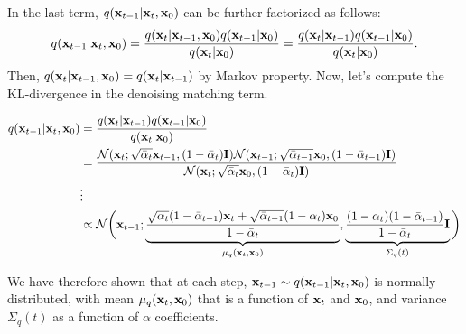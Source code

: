 In the last term, $q({\mathbf{x}}_{t-1}|{\mathbf{x}}_t, {\mathbf{x}}_0)$ can be further factorized as follows:
\begin{align*}
	q({\mathbf{x}}_{t-1}|{\mathbf{x}}_t, {\mathbf{x}}_0) = \frac{q({\mathbf{x}}_{t}|{\mathbf{x}}_{t-1}, {\mathbf{x}}_0)q({\mathbf{x}}_{t-1}|{\mathbf{x}}_0)}{q({\mathbf{x}}_{t}|{\mathbf{x}}_0)}=\frac{q({\mathbf{x}}_{t}|{\mathbf{x}}_{t-1})q({\mathbf{x}}_{t-1}|{\mathbf{x}}_0)}{q({\mathbf{x}}_{t}|{\mathbf{x}}_0)}.
\end{align*}
Then, $q({\mathbf{x}}_{t}|{\mathbf{x}}_{t-1}, {\mathbf{x}}_0) = q({\mathbf{x}}_{t}|{\mathbf{x}}_{t-1})$ by Markov property. Now, let's compute the KL-divergence in the denoising matching term. 

\begin{align}
	q({\mathbf{x}}_{t-1}|{\mathbf{x}}_t, {\mathbf{x}}_0) &=\frac{q({\mathbf{x}}_{t}|{\mathbf{x}}_{t-1})q({\mathbf{x}}_{t-1}|{\mathbf{x}}_0)}{q({\mathbf{x}}_{t}|{\mathbf{x}}_0)}\\
								 &= \frac{\mathcal{N}(\mathbf{x}_t; \sqrt{\bar{\alpha}_t} {\mathbf{x}}_{t-1}, (1-\bar{\alpha}_t)\mathbf{I})\mathcal{N}(\mathbf{x}_{t-1}; \sqrt{\bar{\alpha}_{t-1}} {\mathbf{x}}_{0}, (1-\bar{\alpha}_{t-1})\mathbf{I})}{\mathcal{N}(\mathbf{x}_t; \sqrt{\bar{\alpha}_t} {\mathbf{x}}_{0}, (1-\bar{\alpha}_t)\mathbf{I})}\\
								 & \vdots\\
								 &\propto \mathcal{N}\bigg({\mathbf{x}}_{t-1};\underbrace{\frac{\sqrt{{\alpha}_{t}}(1-\bar{\alpha}_{t-1}){\mathbf{x}}_t+\sqrt{\bar{\alpha}_{t-1}}(1-{\alpha}_{t}){\mathbf{x}}_0}{1-\bar{\alpha}_{t}}}_{\mu_q({\mathbf{x}}_t,{\mathbf{x}}_0)}, \underbrace{\frac{(1-{\alpha}_{t})(1-\bar{\alpha}_{t-1})}{1-\bar{\alpha}_{t}}\mathbf{I}}_{\Sigma_{q}(t)}\bigg)
	\label{eq:diffusion_kl_true_denoising}
\end{align}

We have therefore shown that at each step, ${\mathbf{x}}_{t-1} \sim q({\mathbf{x}}_{t-1}|{\mathbf{x}}_t, {\mathbf{x}}_0)$ is normally distributed, with mean $\mu_q({\mathbf{x}}_t,{\mathbf{x}}_0)$ that is a function of ${\mathbf{x}}_t$ and ${\mathbf{x}}_0$, and variance $\Sigma_q(t)$ as a function of $\alpha$ coefficients. 


